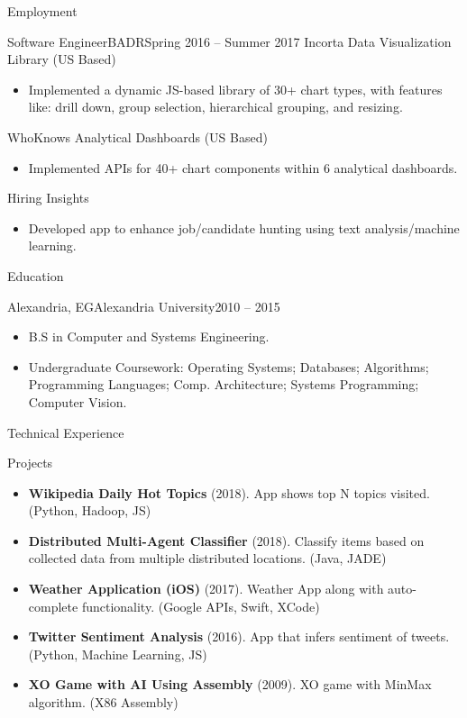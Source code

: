 \documentclass[]{ahmedamrcv}
\begin{document}
\begin{cvsection}{Employment}
		\begin{cvsubsection}{Software Engineer}{BADR}{Spring 2016 -- Summer 2017}
            Incorta Data Visualization Library (US Based)		
			\begin{itemize}
				\item Implemented a dynamic JS-based library of 30+ chart types, with features like: drill down, group selection, hierarchical grouping, and resizing.
			\end{itemize}
			WhoKnows Analytical Dashboards (US Based)
			\begin{itemize}
				\item Implemented APIs for 40+ chart components within 6 analytical dashboards.
			\end{itemize}
			Hiring Insights
			\begin{itemize}
				\item Developed app to enhance job/candidate hunting using text analysis/machine learning.
			\end{itemize}
		\end{cvsubsection}
	\end{cvsection}
	
	\begin{cvsection}{Education}
		\begin{cvsubsection}{Alexandria, EG}{Alexandria University}{2010 -- 2015}
			\begin{itemize}
				\item B.S in Computer and Systems Engineering.
				\item Undergraduate Coursework: Operating Systems; Databases; Algorithms; Programming Languages; Comp. Architecture; Systems Programming; Computer Vision.
			\end{itemize}
		\end{cvsubsection}
	\end{cvsection}
	
	\begin{cvsection}{Technical Experience}
		\begin{cvsubsection}{Projects}{}{}
			\begin{itemize}
    			\item \textbf{Wikipedia Daily Hot Topics} (2018). App shows top N topics visited. (Python, Hadoop, JS)
				\item \textbf{Distributed Multi-Agent Classifier} (2018). Classify items based on collected data from multiple distributed locations. (Java, JADE)
				\item \textbf{Weather Application (iOS)} (2017). Weather App along with auto-complete functionality. (Google APIs, Swift, XCode)
				\item \textbf{Twitter Sentiment Analysis} (2016). App that infers sentiment of tweets. (Python, Machine Learning, JS)
				\item \textbf{XO Game with AI Using Assembly } (2009). XO game with MinMax algorithm. (X86 Assembly)
			\end{itemize}
		\end{cvsubsection}
	\end{cvsection}
	
\end{document}
